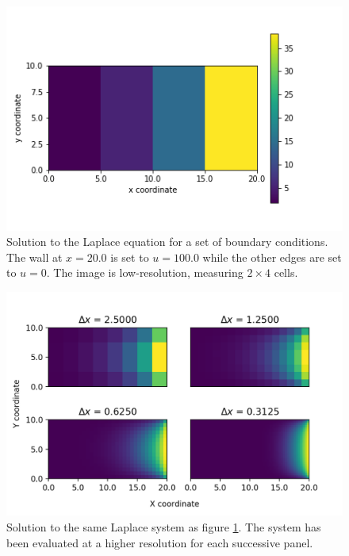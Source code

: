 \documentclass[twocolumn]{article}
\begin{document}
\begin{figure}[t]
\centering
\includegraphics[width=\linewidth]{low_res_iterative}
\caption{Solution to the Laplace equation for a set of boundary conditions. The wall at $x=20.0$ is set to $u=100.0$ while the other edges are set to $u=0$. The image is low-resolution, measuring $2\times4$ cells.}
\label{fig:low_res_iterative}
\end{figure}

\begin{figure}[t]
\centering
\includegraphics[width=\linewidth]{relaxation}
\caption{Solution to the same Laplace system as figure \ref{fig:low_res_iterative}. The system has been evaluated at a higher resolution for each successive panel.}
\label{fig:relaxation}
\end{figure}
\end{document}
